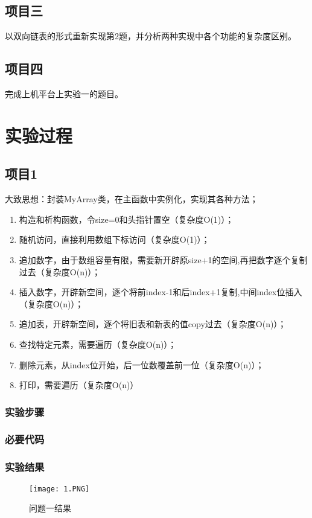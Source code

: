 \subsection{项目三}
以双向链表的形式重新实现第2题，并分析两种实现中各个功能的复杂度区别。

\subsection{项目四}
完成上机平台上实验一的题目。

\section{实验过程}
\subsection{项目1}
大致思想：封装MyArray类，在主函数中实例化，实现其各种方法；
\begin{enumerate}
\item 构造和析构函数，令size=0和头指针置空（复杂度O(1)）；
\item 随机访问，直接利用数组下标访问（复杂度O(1)）；
\item 追加数字，由于数组容量有限，需要新开辟原size+1的空间,再把数字逐个复制过去（复杂度O(n)）；
\item 插入数字，开辟新空间，逐个将前index-1和后index+1复制,中间index位插入（复杂度O(n)）；
\item 追加表，开辟新空间，逐个将旧表和新表的值copy过去（复杂度O(n)）；
\item 查找特定元素，需要遍历（复杂度O(n)）；
\item 删除元素，从index位开始，后一位数覆盖前一位（复杂度O(n)）；
\item 打印，需要遍历（复杂度O(n)）
\end{enumerate}

\subsubsection{实验步骤}
\subsubsection{必要代码}

\subsubsection{实验结果}
	\begin{figure}[!bthp]
	\centering
        \texttt{[image: 1.PNG]}
        \caption{问题一结果}
      \end{figure}

